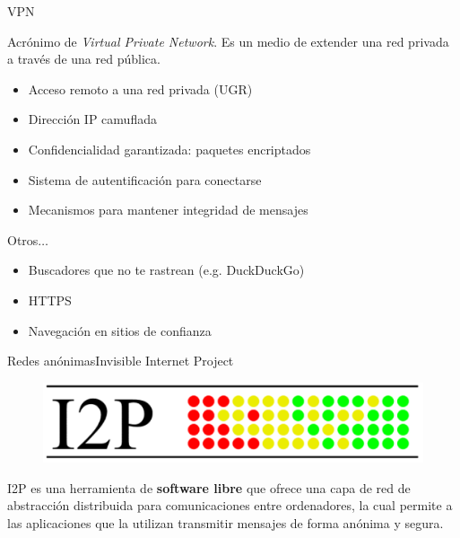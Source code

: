 \documentclass[spanish]{beamer}
\begin{document}
\begin{frame}{VPN}

Acrónimo de \textit{Virtual Private Network}. Es un medio de extender una red privada a través de una red pública.

\vspace{1.9em}

\begin{itemize}
	\item Acceso remoto a una red privada (UGR) \\
	\item Dirección IP camuflada \\ 
	\item Confidencialidad garantizada: paquetes encriptados \\
	\item Sistema de autentificación para conectarse
	\item Mecanismos para mantener integridad de mensajes
\end{itemize}	

\end{frame}



\begin{frame}{Otros$\dots$}

\begin{itemize}
	\item Buscadores que no te rastrean (e.g. DuckDuckGo)
	\item HTTPS
	\item Navegación en sitios de confianza
\end{itemize}

\end{frame}



\begin{frame}{Redes anónimas}{Invisible Internet Project}
	\vspace{-1em}
	
	\begin{figure}
	\centering
	\includegraphics[width=.5\textwidth]{img/i2p_logo}
\end{figure}
I2P es una herramienta de \textbf{software libre} que ofrece una capa de red de abstracción distribuida para comunicaciones entre ordenadores, la cual permite a las aplicaciones que la utilizan transmitir mensajes de forma anónima y segura.
	
\end{frame}
\end{document}
